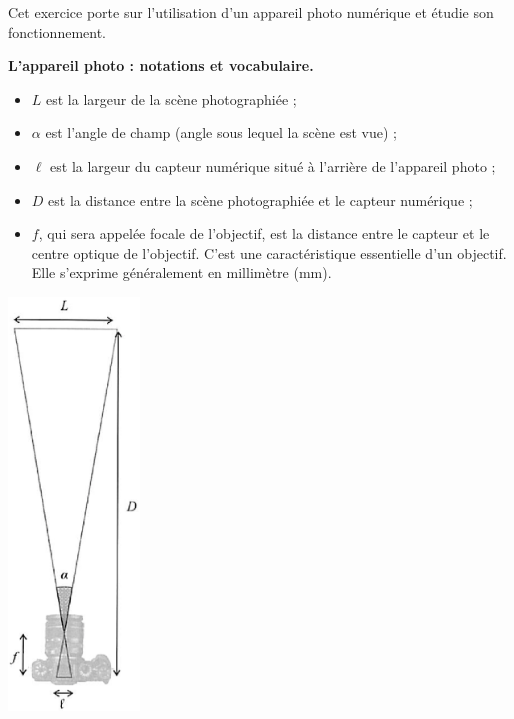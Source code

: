 \bigskip


\begin{exercice}[CRPE 2016 G2]
   Cet exercice porte sur l'utilisation d'un appareil photo numérique et étudie son fonctionnement. \\
   \begin{minipage}{9cm}
      {\bf L'appareil photo : notations et vocabulaire.} \\ [5mm]
      \begin{itemize}
         \item $L$ est la largeur de la scène photographiée ;
         \item $\alpha$ est l'angle de champ (angle sous lequel la scène est vue) ;
         \item $\ell$ est la largeur du capteur numérique situé à l'arrière de l'appareil photo ;
         \item $D$ est la distance entre la scène photographiée et le capteur numérique ;
         \item $f$, qui sera appelée focale de l'objectif, est la distance entre le capteur et le centre optique de l'objectif. C'est une caractéristique essentielle d'un objectif. Elle s'exprime généralement en millimètre (mm).
      \end{itemize}
   \end{minipage}
   \hspace{2cm}
   \begin{minipage}{5cm}
      \includegraphics[width=3.5cm]{Geometrie/Images/G11_ex_appareil_photo}
   \end{minipage}


\end{exercice}
